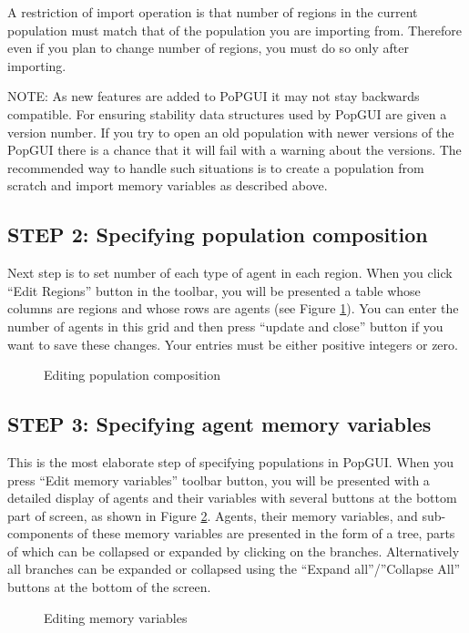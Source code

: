 \documentclass{article}
\begin{document}
A restriction of import operation is that number of regions in the current population must match that of the population you are importing from. Therefore even if you plan to change number of regions, you must do so only after importing.

NOTE: As new features are added to PoPGUI it may not stay backwards compatible. For ensuring stability data structures used by PopGUI are given a version number. If you try to open an old population with newer versions of the PopGUI there is a chance that it will fail with a warning about the versions. The recommended way to handle such situations is to create a population from scratch and import memory variables as described above.

\subsection{STEP 2: Specifying population composition}
Next step is to set number of each type of agent in each region. When you click ``Edit Regions'' button in the toolbar, you will be presented a table whose columns are regions and whose rows are agents (see Figure \ref{fig:regions}). You can enter the number of agents in this grid and then press ``update and close'' button if you want to save these changes. Your entries must be either positive integers or zero. 
\begin{figure}
\caption{Editing population composition}
\label{fig:regions}
\end{figure}

\subsection{STEP 3: Specifying agent memory variables}
This is the most elaborate step of specifying populations in PopGUI. When you press ``Edit memory variables'' toolbar button, you will be presented with a detailed display of agents and their variables with several buttons at the bottom part of screen, as shown in Figure \ref{fig:memvars}. Agents, their memory variables, and sub-components of these memory variables are presented in the form of a tree, parts of which can be collapsed or expanded by clicking on the branches. Alternatively all branches can be expanded or collapsed using the ``Expand all''/''Collapse All'' buttons at the bottom of the screen. 
\begin{figure}
\caption{Editing memory variables}
\label{fig:memvars}
\end{figure}
\end{document}

